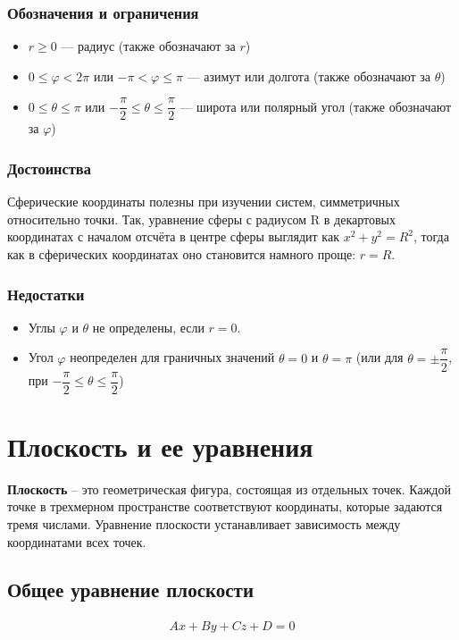 \documentclass[a4paper,12pt,oneside]{extbook}
\theoremstyle{numbered}
\theoremstyle{unnumbered}
\theoremstyle{named}
\theoremstyle{unnumbered}
\theoremstyle{named}
\theoremstyle{named}
\theoremstyle{named}
\begin{document}
\subsubsection{Обозначения и ограничения}
\begin{itemize}
    \item {\(r \geq 0\) — радиус (также обозначают за \(r\))}
    \item {\(0 \leq \varphi < 2\pi\) или \(-\pi < \varphi \leq \pi\) — азимут или долгота (также обозначают за \(\theta\))}
    \item {\(0 \leq \theta \leq \pi\) или \(-\dfrac{\pi}{2} \leq \theta \leq \dfrac{\pi}{2}\) — широта или полярный угол (также обозначают за \(\varphi\))}
\end{itemize}

\subsubsection{Достоинства}
Сферические координаты полезны при изучении систем, симметричных относительно точки. Так, уравнение сферы с радиусом R в декартовых координатах с началом отсчёта в центре сферы выглядит как \(x^2 + y^2 = R^2\), тогда как в сферических координатах оно становится намного проще: \(r = R\).

\subsubsection{Недостатки}
\begin{itemize}
    \item Углы \(\varphi\) и \(\theta\) не определены, если \(r = 0\).
    \item Угол \(\varphi\) неопределен для граничных значений \(\theta = 0\) и \(\theta = \pi\) (или для \(\theta = \pm \dfrac{\pi}{2}\), при \(-\dfrac{\pi}{2} \leq \theta \leq \dfrac{\pi}{2}\))
\end{itemize}

\section{Плоскость и ее уравнения}\label{sec:plane}

\textbf{Плоскость} – это геометрическая фигура, состоящая из отдельных точек. Каждой точке в трехмерном пространстве соответствуют координаты, которые задаются тремя числами. Уравнение плоскости устанавливает зависимость между координатами всех точек.

\subsection{Общее уравнение плоскости}
\begin{gather*}
    Ax + By + Cz + D = 0
\end{gather*}
\end{document}
